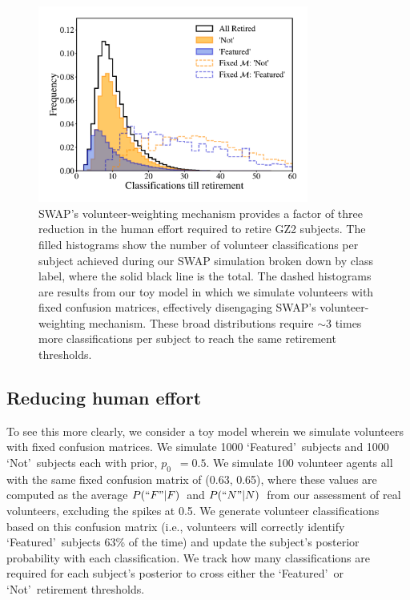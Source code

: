 \documentclass[twocolumn,  trackchanges, ]{aastex6}%
\newcommand{\Pf}{$P(``F"|F)$}
\newcommand{\Pn}{$P(``N"|N)$}
\newcommand{\p}{$p_0$}
\newcommand{\feat}{`Featured'}
\newcommand{\notfeat}{`Not'}
\begin{document}
\begin{figure}[t!] 
\centering
\includegraphics[width=3.5in]{f7.pdf}
\caption{
SWAP's volunteer-weighting mechanism provides a factor of three reduction in the human effort required to retire GZ2 subjects. The filled histograms show the number of volunteer classifications per subject achieved during our SWAP simulation broken down by class label, where the solid black line is the total. The dashed histograms are results from our toy model in which we simulate volunteers with fixed confusion matrices, effectively disengaging SWAP's volunteer-weighting mechanism. These broad distributions require $\sim$3 times more classifications per subject to reach the same retirement thresholds. } \label{fig: swap vote distributions}
\end{figure}

\subsection{Reducing human effort}
 To see this more clearly, we consider a toy model wherein we simulate volunteers with fixed confusion matrices. We simulate 1000 \feat~subjects and 1000 \notfeat~subjects each with prior, \p~$ = 0.5$. We simulate 100 volunteer agents all with the same fixed confusion matrix of (0.63, 0.65), where these values are computed as the average \Pf~and \Pn~from our assessment of real volunteers, excluding the spikes at 0.5. We generate volunteer classifications based on this confusion matrix (i.e., volunteers will correctly identify \feat~subjects 63\% of the time) and update the subject's posterior probability with each classification. We track how many classifications are required for each subject's posterior to cross either the \feat~or \notfeat~retirement thresholds. 
\end{document}
